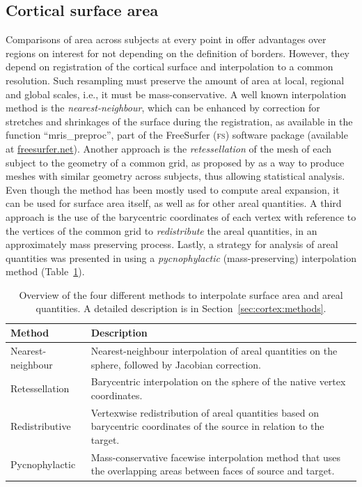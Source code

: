 \subsection{Cortical surface area}

Comparisons of area across subjects at every point in offer advantages over regions on interest for not depending on the definition of borders. However, they depend on registration of the cortical surface and interpolation to a common resolution. Such resampling must preserve the amount of area at local, regional and global scales, i.e., it must be mass-conservative. A well known interpolation method is the \emph{nearest-neighbour}, which can be enhanced by correction for stretches and shrinkages of the surface during the registration, as available in the function ``mris\_preproc'', part of the FreeSurfer (\textsc{fs}) software package (available at \href{http://freesurfer.net}{freesurfer.net}). Another approach is the \emph{retessellation} of the mesh of each subject to the geometry of a common grid, as proposed by \cite{Saad2004} as a way to produce meshes with similar geometry across subjects, thus allowing statistical analysis. Even though the method has been mostly used to compute areal expansion, it can be used for surface area itself, as well as for other areal quantities. A third approach is the use of the barycentric coordinates of each vertex with reference to the vertices of the common grid to \emph{redistribute} the areal quantities, in an approximately mass preserving process. Lastly, a strategy for analysis of areal quantities was presented in \cite{Winkler2012} using a \emph{pycnophylactic} (mass-preserving) interpolation method (Table~\ref{tab:overview}).

\begin{table}[!tp]
\caption[Overview of the four different methods to interpolate surface area and areal quantities.]{Overview of the four different methods to interpolate surface area and areal quantities. A detailed description is in Section~\ref{sec:cortex:methods}.}
\begin{center}
\begin{small}
\begin{tabular}{@{}m{28mm}<{\raggedright}m{96mm}<{\raggedright}@{}}
\toprule
\textbf{Method} & \textbf{Description} \\ 
\midrule
Nearest-neighbour & Nearest-neighbour interpolation of areal quantities on the sphere, followed by Jacobian correction.\\
\midrule
Retessellation & Barycentric interpolation on the sphere of the native vertex coordinates.\\
\midrule
Redistributive & Vertexwise redistribution of areal quantities based on bary\-centric coordinates of the source in relation to the target.\\
\midrule
Pycnophylactic & Mass-conservative facewise interpolation method that uses the overlapping areas between faces of source and target.\\
\bottomrule
\end{tabular}
\end{small}
\end{center}
\label{tab:overview}
\end{table}

